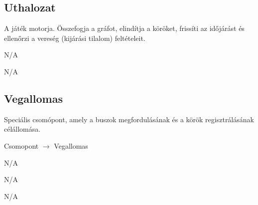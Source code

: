 \subsection{Uthalozat}
\begin{class-template-responsibility}
    A játék motorja. Összefogja a gráfot, elindítja a köröket, frissíti az időjárást és ellenőrzi a vereség (kijárási tilalom) feltételeit.
\end{class-template-responsibility}
\begin{class-template-baseclass}
    N/A
\end{class-template-baseclass}
\begin{class-template-interface}
    N/A
    \end{class-template-interface}
\begin{class-template-attribute}
\end{class-template-attribute}
\begin{class-template-method}
\end{class-template-method}

\subsection{Vegallomas}
\begin{class-template-responsibility}
    Speciális csomópont, amely a buszok megfordulásának és a körök regisztrálásának célállomása.
\end{class-template-responsibility}
\begin{class-template-baseclass}
    Csomopont $\rightarrow$ Vegallomas
\end{class-template-baseclass}
\begin{class-template-interface}
    N/A
\end{class-template-interface}
\begin{class-template-attribute}
    N/A
\end{class-template-attribute}
\begin{class-template-method}
    N/A
\end{class-template-method}

